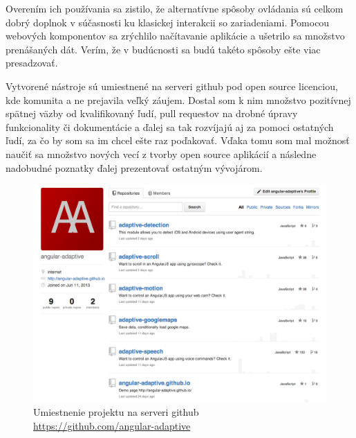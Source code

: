 Overením ich používania sa zistilo, že alternatívne spôsoby ovládania sú celkom dobrý doplnok v súčasnosti ku klasickej interakcii so zariadeniami. Pomocou webových komponentov sa zrýchlilo načítavanie aplikácie a ušetrilo sa množstvo prenášaných dát. Verím, že v budúcnosti sa budú takéto spôsoby ešte viac presadzovať.

Vytvorené nástroje sú umiestnené na serveri github pod open source licenciou, kde komunita a ne prejavila veľký záujem. Dostal som k nim množstvo pozitívnej spätnej väzby od kvalifikovaný ľudí, pull requestov na drobné úpravy funkcionality či dokumentácie a ďalej sa tak rozvíjajú aj za pomoci ostatných ľudí, za čo by som sa im chcel ešte raz poďakovať. Vďaka tomu som mal možnosť naučiť sa množstvo nových vecí z tvorby open source aplikácií a následne nadobudné poznatky ďalej prezentovať ostatným vývojárom.

\begin{figure}[H]
  \centering
  \includegraphics[width=1.0\textwidth]{img/github.png}
  \caption[Umiestnenie projektu na serveri github]{
    Umiestnenie projektu na serveri github\\
    \url{https://github.com/angular-adaptive}}
  \label{fig: github}
\end{figure}

